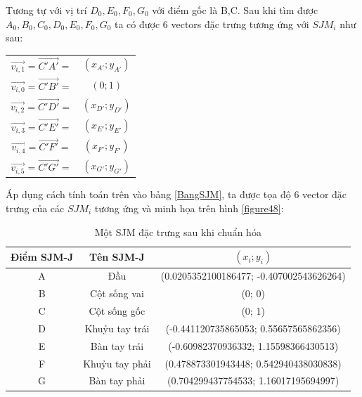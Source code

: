 Tương tự với vị trí $D_0, E_0, F_0, G_0$ với điểm gốc là B,C. Sau khi tìm được $A_0, B_0, C_0, D_0, E_0, F_0, G_0$ ta có được 6 vectors đặc trưng tương ứng với $SJM_i$ như sau:

\begin{tabular}{c c}
$\overrightarrow {{v_{i,1}}}  = \overrightarrow {C'A'}  = $&$({x_{A'}};{y_{A'}})$ \\ 
$\overrightarrow {{v_{i,0}}}  = \overrightarrow {C'B'}  = $&$(0;1)$ \\ 
$\overrightarrow {{v_{i,2}}}  = \overrightarrow {C'D'}  = $&$({x_{D'}};{y_{D'}})$ \\ 
$\overrightarrow {{v_{i,3}}}  = \overrightarrow {C'E'}  = $&$({x_{E'}};{y_{E'}})$ \\ 
$\overrightarrow {{v_{i,4}}}  = \overrightarrow {C'F'}  = $&$({x_{F'}};{y_{F'}})$ \\ 
$\overrightarrow {{v_{i,5}}}  = \overrightarrow {C'G'}  = $&$({x_{G'}};{y_{G'}})$ \\ 


\end{tabular} 

Áp dụng cách tính toán trên vào bảng \ref{BangSJM}, ta được tọa độ 6 vector đặc trưng của các $SJM_i$ tương ứng và minh họa trên hình \ref{figure48}:

\begin{table}[htbp]
\centering
\caption{Một SJM đặc trưng sau khi chuẩn hóa}
\begin{tabular}{|c|c|c|}
\hline 
 Điểm SJM-J & Tên SJM-J & $(x_i; y_i) $\\ 
\hline 
A & Đầu  & (0.0205352100186477; -0.407002543626264) \\ 
\hline 
B & Cột sống vai & (0; 0) \\ 
\hline 	
C & Cột sống gốc & (0; 1) \\ 
\hline 
D & Khuỷu tay trái & (-0.441120735865053; 0.55657565862356) \\ 
\hline 
E & Bàn tay trái & (-0.60982370936332; 1.15598366430513) \\ 
\hline
F & Khuỷu tay phải & (0.478873301943448; 0.542940438030838) \\ 
\hline
G & Bàn tay phải & (0.704299437754533; 1.16017195694997) \\ 
\hline 
\end{tabular} 
\label{BangSJMResult}
\end{table}


